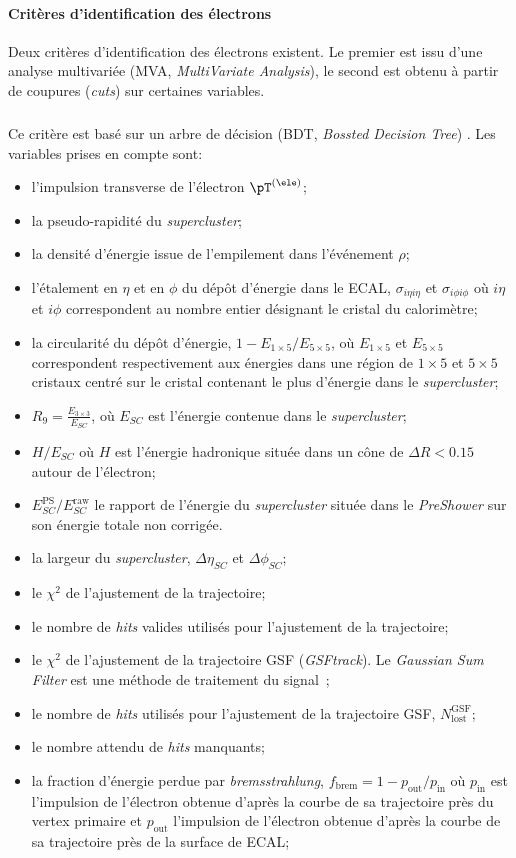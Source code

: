 \paragraph{Critères d'identification des électrons}
Deux critères d'identification des électrons existent.
Le premier est issu d'une analyse multivariée (MVA, \emph{MultiVariate Analysis}), le second est obtenu à partir de coupures (\emph{cuts}) sur certaines variables.
\subparagraph{\EleIDMVA}
Ce critère est basé sur un arbre de décision (BDT, \emph{Bossted Decision Tree}) \cite{cmsElectronMVA}.
Les variables prises en compte sont:
\begin{itemize}
\item l'impulsion transverse de l'électron $\pT^{(\ele)}$;
\item la pseudo-rapidité du \emph{supercluster};
\item la densité d'énergie issue de l'empilement dans l'événement $\rho$;

\item l'étalement en $\eta$ et en $\phi$ du dépôt d'énergie dans le ECAL, $\sigma_{i\eta i\eta}$ et $\sigma_{i\phi i\phi}$ où $i\eta$ et $i\phi$ correspondent au nombre entier désignant le cristal du calorimètre;
\item la circularité du dépôt d'énergie, $1- E_{1\times5}/E_{5\times5}$, où $ E_{1\times5}$ et $E_{5\times5}$ correspondent respectivement aux énergies dans une région de $1\times5$ et $5\times5$ cristaux centré sur le cristal contenant le plus d'énergie dans le \emph{supercluster};
\item $R_9 = \frac{E_{3\times3}}{E_{SC}}$, où $E_{SC}$ est l'énergie contenue dans le \emph{supercluster};
\item $H/E_{SC}$ où $H$ est l'énergie hadronique située dans un cône de $\Delta R < \num{0.15}$ autour de l'électron;
\item $E_{SC}^\text{PS}/E_{SC}^\text{raw}$ le rapport de l'énergie du \emph{supercluster} située dans le \emph{PreShower} sur son énergie totale non corrigée.
\item la largeur du \emph{supercluster}, $\Delta \eta_{SC}$ et $\Delta \phi_{SC}$;

\item le $\chi^2$ de l'ajustement de la trajectoire;
\item le nombre de \emph{hits} valides utilisés pour l'ajustement de la trajectoire;
\item le $\chi^2$ de l'ajustement de la trajectoire GSF (\emph{GSFtrack}). Le \emph{Gaussian Sum Filter} est une méthode de traitement du signal~\cite{GSF};
\item le nombre de \emph{hits} utilisés pour l'ajustement de la trajectoire GSF, $N_\text{lost}^\text{GSF}$;
\item le nombre attendu de \emph{hits} manquants;
\item la fraction d'énergie perdue par \emph{bremsstrahlung}, $f_\text{brem} = 1-p_\text{out}/p_\text{in}$ où
$p_\text{in}$ est l'impulsion de l'électron obtenue d'après la courbe de sa trajectoire près du vertex primaire et
$p_\text{out}$ l'impulsion de l'électron obtenue d'après la courbe de sa trajectoire près de la surface de ECAL;


\end{itemize}
